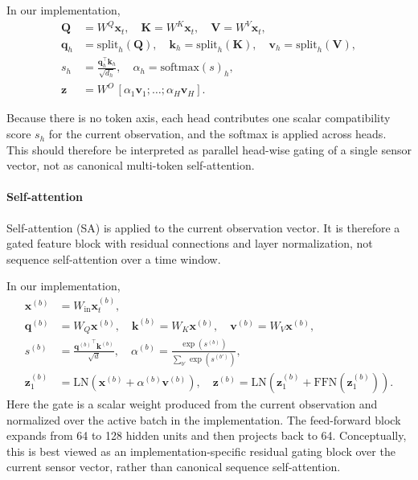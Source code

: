 \documentclass[sn-basic]{sn-jnl}%
\begin{document}
In our implementation,
\begin{align}
        \mathbf{Q}&=W^Q\mathbf{x}_t,\quad \mathbf{K}=W^K\mathbf{x}_t,\quad \mathbf{V}=W^V\mathbf{x}_t,\\
        \mathbf{q}_h&=\mathrm{split}_h(\mathbf{Q}),\quad \mathbf{k}_h=\mathrm{split}_h(\mathbf{K}),\quad \mathbf{v}_h=\mathrm{split}_h(\mathbf{V}),\\
        s_h&=\frac{\mathbf{q}_h^\top\mathbf{k}_h}{\sqrt{d_h}},\quad \alpha_h=\mathrm{softmax}(s)_h,\\
        \mathbf{z}&=W^O\,[\alpha_1\mathbf{v}_1;\ldots;\alpha_H\mathbf{v}_H].
\end{align}

Because there is no token axis, each head contributes one scalar compatibility score $s_h$ for the current observation, and the softmax is applied across heads. This should therefore be interpreted as parallel head-wise gating of a single sensor vector, not as canonical multi-token self-attention.

\paragraph{Self-attention}
Self-attention (SA) is applied to the current observation vector. It is therefore a gated feature block with residual connections and layer normalization, not sequence self-attention over a time window.

In our implementation,
\begin{align}
		\mathbf{x}^{(b)} &= W_{\mathrm{in}}\mathbf{x}_t^{(b)},\\
		\mathbf{q}^{(b)} &= W_Q\mathbf{x}^{(b)},\quad \mathbf{k}^{(b)}=W_K\mathbf{x}^{(b)},\quad \mathbf{v}^{(b)}=W_V\mathbf{x}^{(b)},\\
		s^{(b)} &= \frac{{\mathbf{q}^{(b)}}^\top\mathbf{k}^{(b)}}{\sqrt{d}},\quad
		\alpha^{(b)}=\frac{\exp(s^{(b)})}{\sum_{b'}\exp(s^{(b')})},\\
		\mathbf{z}_1^{(b)} &= \mathrm{LN}\!\left(\mathbf{x}^{(b)}+\alpha^{(b)}\mathbf{v}^{(b)}\right),\quad
		\mathbf{z}^{(b)}=\mathrm{LN}\!\left(\mathbf{z}_1^{(b)}+\mathrm{FFN}(\mathbf{z}_1^{(b)})\right).
\end{align}
Here the gate is a scalar weight produced from the current observation and normalized over the active batch in the implementation. The feed-forward block expands from 64 to 128 hidden units and then projects back to 64. Conceptually, this is best viewed as an implementation-specific residual gating block over the current sensor vector, rather than canonical sequence self-attention.
\end{document}
